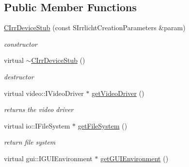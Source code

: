 \subsection*{Public Member Functions}
\begin{DoxyCompactItemize}
\item 
\hypertarget{classirr_1_1_c_irr_device_stub_ae1de145b9033cc20012ea67806f0f82a}{\hyperlink{classirr_1_1_c_irr_device_stub_ae1de145b9033cc20012ea67806f0f82a}{C\-Irr\-Device\-Stub} (const S\-Irrlicht\-Creation\-Parameters \&param)}\label{classirr_1_1_c_irr_device_stub_ae1de145b9033cc20012ea67806f0f82a}

\begin{DoxyCompactList}\small\item\em constructor \end{DoxyCompactList}\item 
\hypertarget{classirr_1_1_c_irr_device_stub_a362696a1135842466b2776d77bedaa35}{virtual \hyperlink{classirr_1_1_c_irr_device_stub_a362696a1135842466b2776d77bedaa35}{$\sim$\-C\-Irr\-Device\-Stub} ()}\label{classirr_1_1_c_irr_device_stub_a362696a1135842466b2776d77bedaa35}

\begin{DoxyCompactList}\small\item\em destructor \end{DoxyCompactList}\item 
\hypertarget{classirr_1_1_c_irr_device_stub_a1f7888b17a3e064ea042fa864a25996d}{virtual video\-::\-I\-Video\-Driver $\ast$ \hyperlink{classirr_1_1_c_irr_device_stub_a1f7888b17a3e064ea042fa864a25996d}{get\-Video\-Driver} ()}\label{classirr_1_1_c_irr_device_stub_a1f7888b17a3e064ea042fa864a25996d}

\begin{DoxyCompactList}\small\item\em returns the video driver \end{DoxyCompactList}\item 
\hypertarget{classirr_1_1_c_irr_device_stub_a89e80741032efd9fbf1435a525dc370f}{virtual io\-::\-I\-File\-System $\ast$ \hyperlink{classirr_1_1_c_irr_device_stub_a89e80741032efd9fbf1435a525dc370f}{get\-File\-System} ()}\label{classirr_1_1_c_irr_device_stub_a89e80741032efd9fbf1435a525dc370f}

\begin{DoxyCompactList}\small\item\em return file system \end{DoxyCompactList}\item 
\hypertarget{classirr_1_1_c_irr_device_stub_a2dcaf39201f2d1d50b9f0ba58169c0d3}{virtual gui\-::\-I\-G\-U\-I\-Environment $\ast$ \hyperlink{classirr_1_1_c_irr_device_stub_a2dcaf39201f2d1d50b9f0ba58169c0d3}{get\-G\-U\-I\-Environment} ()}\label{classirr_1_1_c_irr_device_stub_a2dcaf39201f2d1d50b9f0ba58169c0d3}


\end{DoxyCompactItemize}
